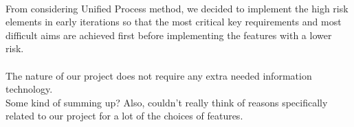 \paragraph{}
From considering Unified Process method, we decided to implement the high risk elements in early iterations so that the most critical key requirements and most difficult aims are achieved first before implementing the features with a lower risk.

\paragraph{}
The nature of our project does not require any extra needed information technology. \\
Some kind of summing up? Also, couldn't really think of reasons specifically related to our project for a lot of the choices of features.
